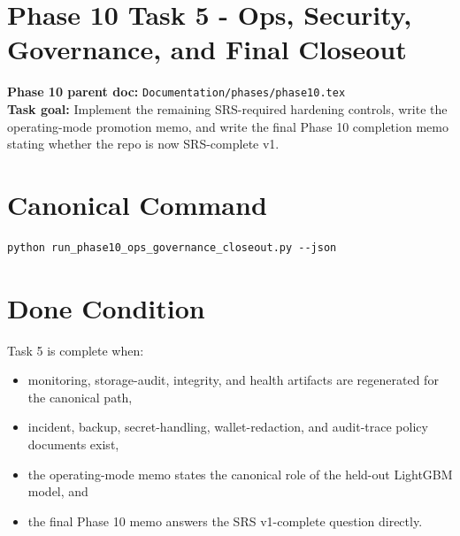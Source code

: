 \documentclass{article}
\begin{document}
\section*{Phase 10 Task 5 - Ops, Security, Governance, and Final Closeout}

\textbf{Phase 10 parent doc:} \texttt{Documentation/phases/phase10.tex}\\
\textbf{Task goal:} Implement the remaining SRS-required hardening controls, write the operating-mode promotion memo, and write the final Phase 10 completion memo stating whether the repo is now SRS-complete v1.

\section*{Canonical Command}
\begin{verbatim}
python run_phase10_ops_governance_closeout.py --json
\end{verbatim}

\section*{Done Condition}
Task 5 is complete when:
\begin{itemize}
\item monitoring, storage-audit, integrity, and health artifacts are regenerated for the canonical path,
\item incident, backup, secret-handling, wallet-redaction, and audit-trace policy documents exist,
\item the operating-mode memo states the canonical role of the held-out LightGBM model, and
\item the final Phase 10 memo answers the SRS v1-complete question directly.
\end{itemize}
\end{document}
